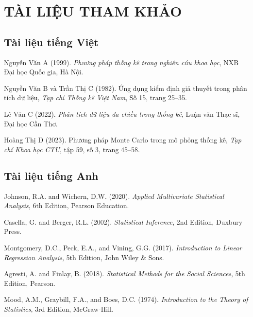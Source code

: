 \chapter*{TÀI LIỆU THAM KHẢO}

\begin{thebibliography}{99}

\section*{Tài liệu tiếng Việt}

 Nguyễn Văn A (1999). \textit{Phương pháp thống kê trong nghiên cứu khoa học}, NXB Đại học Quốc gia, Hà Nội.

 Nguyễn Văn B và Trần Thị C (1982). Ứng dụng kiểm định giả thuyết trong phân tích dữ liệu, \textit{Tạp chí Thống kê Việt Nam}, Số 15, trang 25--35.

 Lê Văn C (2022). \textit{Phân tích dữ liệu đa chiều trong thống kê}, Luận văn Thạc sĩ, Đại học Cần Thơ.

 Hoàng Thị D (2023). Phương pháp Monte Carlo trong mô phỏng thống kê, \textit{Tạp chí Khoa học CTU}, tập 59, số 3, trang 45--58.

\section*{Tài liệu tiếng Anh}

 Johnson, R.A. and Wichern, D.W. (2020). \textit{Applied Multivariate Statistical Analysis}, 6th Edition, Pearson Education.

 Casella, G. and Berger, R.L. (2002). \textit{Statistical Inference}, 2nd Edition, Duxbury Press.

 Montgomery, D.C., Peck, E.A., and Vining, G.G. (2017). \textit{Introduction to Linear Regression Analysis}, 5th Edition, John Wiley \& Sons.

 Agresti, A. and Finlay, B. (2018). \textit{Statistical Methods for the Social Sciences}, 5th Edition, Pearson.

 Mood, A.M., Graybill, F.A., and Boes, D.C. (1974). \textit{Introduction to the Theory of Statistics}, 3rd Edition, McGraw-Hill.

\end{thebibliography}